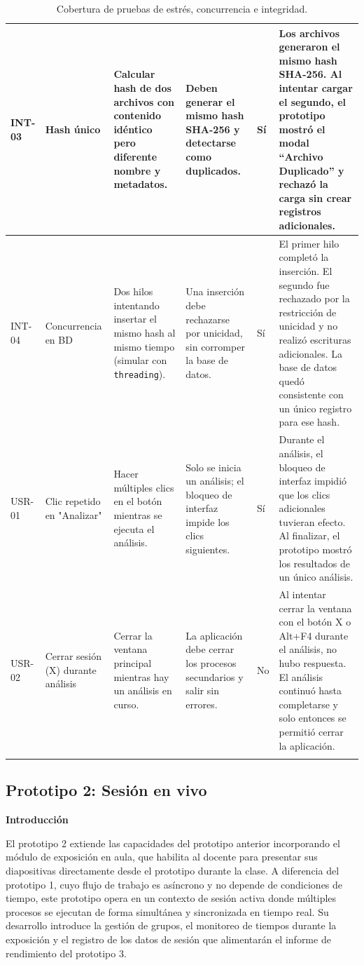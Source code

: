 \documentclass[11pt]{article}
\newif\ifshowttiimarks
\newcommand{\ttiiTOC}[1]{%
  \ifshowttiimarks
    \texorpdfstring{\textcolor{ttiipurple}{\textbf{#1}}}{#1}%
  \else
    #1%
  \fi
}
\begin{document}
{\begin{longtable}{@{}|L{1.5cm}|L{3cm}|L{3.5cm}|L{3.5cm}|L{1.5cm}|L{1.7cm}|@{}}
INT-03 & Hash único & Calcular hash de dos archivos con contenido idéntico pero diferente nombre y metadatos. & Deben generar el mismo hash SHA-256 y detectarse como duplicados. & Sí & Los archivos generaron el mismo hash SHA-256. Al intentar cargar el segundo, el prototipo mostró el modal “Archivo Duplicado” y rechazó la carga sin crear registros adicionales. \\ \hline
INT-04 & Concurrencia en BD & Dos hilos intentando insertar el mismo hash al mismo tiempo (simular con \texttt{threading}). & Una inserción debe rechazarse por unicidad, sin corromper la base de datos. & Sí & El primer hilo completó la inserción. El segundo fue rechazado por la restricción de unicidad y no realizó escrituras adicionales. La base de datos quedó consistente con un único registro para ese hash. \\ \hline
USR-01 & Clic repetido en "Analizar" & Hacer múltiples clics en el botón mientras se ejecuta el análisis. & Solo se inicia un análisis; el bloqueo de interfaz impide los clics siguientes. & Sí & Durante el análisis, el bloqueo de interfaz impidió que los clics adicionales tuvieran efecto. Al finalizar, el prototipo mostró los resultados de un único análisis. \\ \hline
USR-02 & Cerrar sesión (X) durante análisis & Cerrar la ventana principal mientras hay un análisis en curso. & La aplicación debe cerrar los procesos secundarios y salir sin errores. & No & Al intentar cerrar la ventana con el botón X o Alt+F4 durante el análisis, no hubo respuesta. El análisis continuó hasta completarse y solo entonces se permitió cerrar la aplicación. \\ \hline
\caption{Cobertura de pruebas de estrés, concurrencia e integridad.}
\label{tab:cobertura-estres}
\end{longtable}
}






\clearpage
\subsection*{Prototipo 2: Sesión en vivo}
\addcontentsline{toc}{subsection}{\protect\ttiiTOC{Prototipo 2: Sesión en vivo}}

\textbf{Introducción}

El prototipo 2 extiende las capacidades del prototipo anterior incorporando el módulo de exposición en aula, que habilita al docente para presentar sus diapositivas directamente desde el prototipo durante la clase. A diferencia del prototipo 1, cuyo flujo de trabajo es asíncrono y no depende de condiciones de tiempo, este prototipo opera en un contexto de sesión activa donde múltiples procesos se ejecutan de forma simultánea y sincronizada en tiempo real. Su desarrollo introduce la gestión de grupos, el monitoreo de tiempos durante la exposición y el registro de los datos de sesión que alimentarán el informe de rendimiento del prototipo 3.
\end{document}
